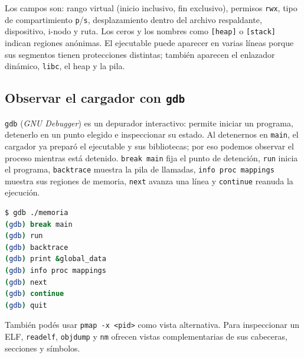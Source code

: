 \documentclass[11pt,a4paper]{article}
\begin{document}
Los campos son: rango virtual (inicio inclusivo, fin exclusivo), permisos
\texttt{rwx}, tipo de compartimiento \texttt{p}/\texttt{s}, desplazamiento
dentro del archivo respaldante, dispositivo, i-nodo y ruta. Los ceros y los
nombres como \texttt{[heap]} o \texttt{[stack]} indican regiones anónimas.
El ejecutable puede aparecer en varias líneas porque sus segmentos tienen
protecciones distintas; también aparecen el enlazador dinámico,
\texttt{libc}, el heap y la pila.


\subsection{Observar el cargador con \texttt{gdb}}

\texttt{gdb} (\emph{GNU Debugger}) es un depurador interactivo: permite
iniciar un programa, detenerlo en un punto elegido e inspeccionar su estado.
Al detenernos en \texttt{main}, el cargador ya preparó el ejecutable y sus
bibliotecas; por eso podemos observar el proceso mientras está detenido.
\texttt{break main} fija el punto de detención, \texttt{run} inicia el
programa, \texttt{backtrace} muestra la pila de llamadas,
\texttt{info proc mappings} muestra sus regiones de memoria,
\texttt{next} avanza una línea y \texttt{continue} reanuda la ejecución.

\begin{lstlisting}[language=bash]
$ gdb ./memoria
(gdb) break main
(gdb) run
(gdb) backtrace
(gdb) print &global_data
(gdb) info proc mappings
(gdb) next
(gdb) continue
(gdb) quit
\end{lstlisting}

También podés usar \texttt{pmap -x <pid>} como vista alternativa. Para
inspeccionar un ELF, \texttt{readelf}, \texttt{objdump} y \texttt{nm}
ofrecen vistas complementarias de sus cabeceras, secciones y símbolos.
\end{document}
